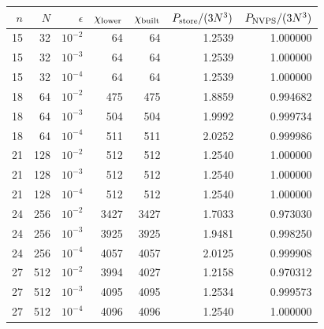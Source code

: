 \begin{tabular}{rrrrrrr}
\hline
$n$ & $N$ & $\epsilon$ & $\chi_{\rm lower}$ & $\chi_{\rm built}$ & $P_{\rm store}/(3N^3)$ & $P_{\rm NVPS}/(3N^3)$ \\
\hline
15 & 32 & $10^{-2}$ & 64 & 64 & 1.2539 & 1.000000 \\
15 & 32 & $10^{-3}$ & 64 & 64 & 1.2539 & 1.000000 \\
15 & 32 & $10^{-4}$ & 64 & 64 & 1.2539 & 1.000000 \\
18 & 64 & $10^{-2}$ & 475 & 475 & 1.8859 & 0.994682 \\
18 & 64 & $10^{-3}$ & 504 & 504 & 1.9992 & 0.999734 \\
18 & 64 & $10^{-4}$ & 511 & 511 & 2.0252 & 0.999986 \\
21 & 128 & $10^{-2}$ & 512 & 512 & 1.2540 & 1.000000 \\
21 & 128 & $10^{-3}$ & 512 & 512 & 1.2540 & 1.000000 \\
21 & 128 & $10^{-4}$ & 512 & 512 & 1.2540 & 1.000000 \\
24 & 256 & $10^{-2}$ & 3427 & 3427 & 1.7033 & 0.973030 \\
24 & 256 & $10^{-3}$ & 3925 & 3925 & 1.9481 & 0.998250 \\
24 & 256 & $10^{-4}$ & 4057 & 4057 & 2.0125 & 0.999908 \\
27 & 512 & $10^{-2}$ & 3994 & 4027 & 1.2158 & 0.970312 \\
27 & 512 & $10^{-3}$ & 4095 & 4095 & 1.2534 & 0.999573 \\
27 & 512 & $10^{-4}$ & 4096 & 4096 & 1.2540 & 1.000000 \\
\hline
\end{tabular}
